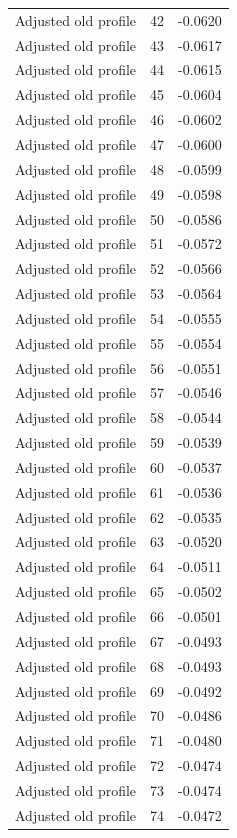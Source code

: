 \begin{table}[htbp]
\begin{tabular}{lll}
Adjusted old profile & 42 & -0.0620 \\
Adjusted old profile & 43 & -0.0617 \\
Adjusted old profile & 44 & -0.0615 \\
Adjusted old profile & 45 & -0.0604 \\
Adjusted old profile & 46 & -0.0602 \\
Adjusted old profile & 47 & -0.0600 \\
Adjusted old profile & 48 & -0.0599 \\
Adjusted old profile & 49 & -0.0598 \\
Adjusted old profile & 50 & -0.0586 \\
Adjusted old profile & 51 & -0.0572 \\
Adjusted old profile & 52 & -0.0566 \\
Adjusted old profile & 53 & -0.0564 \\
Adjusted old profile & 54 & -0.0555 \\
Adjusted old profile & 55 & -0.0554 \\
Adjusted old profile & 56 & -0.0551 \\
Adjusted old profile & 57 & -0.0546 \\
Adjusted old profile & 58 & -0.0544 \\
Adjusted old profile & 59 & -0.0539 \\
Adjusted old profile & 60 & -0.0537 \\
Adjusted old profile & 61 & -0.0536 \\
Adjusted old profile & 62 & -0.0535 \\
Adjusted old profile & 63 & -0.0520 \\
Adjusted old profile & 64 & -0.0511 \\
Adjusted old profile & 65 & -0.0502 \\
Adjusted old profile & 66 & -0.0501 \\
Adjusted old profile & 67 & -0.0493 \\
Adjusted old profile & 68 & -0.0493 \\
Adjusted old profile & 69 & -0.0492 \\
Adjusted old profile & 70 & -0.0486 \\
Adjusted old profile & 71 & -0.0480 \\
Adjusted old profile & 72 & -0.0474 \\
Adjusted old profile & 73 & -0.0474 \\
Adjusted old profile & 74 & -0.0472 \\

\end{tabular}
\end{table}
